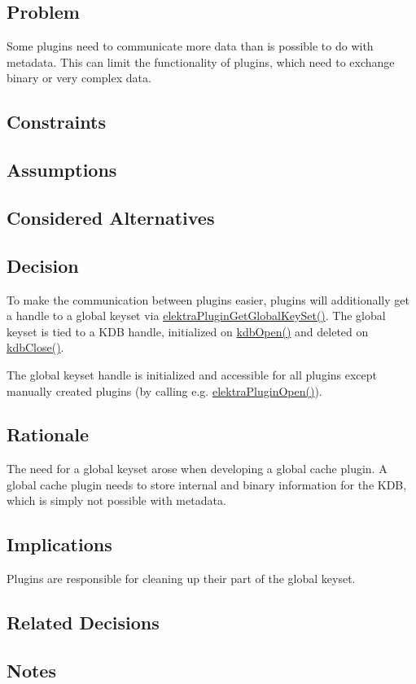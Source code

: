\subsection*{Problem}

Some plugins need to communicate more data than is possible to do with metadata. This can limit the functionality of plugins, which need to exchange binary or very complex data.

\subsection*{Constraints}

\subsection*{Assumptions}

\subsection*{Considered Alternatives}

\subsection*{Decision}

To make the communication between plugins easier, plugins will additionally get a handle to a global keyset via {\ttfamily \hyperlink{group__plugin_ga436cda13ed70c0face08661a90620bf6}{elektra\+Plugin\+Get\+Global\+Key\+Set()}}. The global keyset is tied to a K\+DB handle, initialized on {\ttfamily \hyperlink{group__kdb_ga6808defe5870f328dd17910aacbdc6ca}{kdb\+Open()}} and deleted on {\ttfamily \hyperlink{group__kdb_gadb54dc9fda17ee07deb9444df745c96f}{kdb\+Close()}}.

The global keyset handle is initialized and accessible for all plugins except manually created plugins (by calling e.\+g. {\ttfamily \hyperlink{elektra_2plugin_8c_a32a70a7876542c51d153164ac5108a57}{elektra\+Plugin\+Open()}}).

\subsection*{Rationale}

The need for a global keyset arose when developing a global cache plugin. A global cache plugin needs to store internal and binary information for the K\+DB, which is simply not possible with metadata.

\subsection*{Implications}

Plugins are responsible for cleaning up their part of the global keyset.

\subsection*{Related Decisions}

\subsection*{Notes}